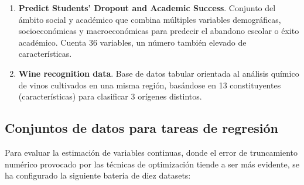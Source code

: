 \documentclass[a4paper,12pt,twoside,final]{book}
\begin{document}
\begin{enumerate}
  para predecir de forma binaria la aparición de diabetes, lo que permite analizar el impacto de la compresión en
  datos médicos sensibles.
  \item \textbf{Predict Students' Dropout and Academic Success}. Conjunto del ámbito social y académico que combina
  múltiples variables demográficas, socioeconómicas y macroeconómicas para predecir el abandono escolar o éxito
  académico. Cuenta 36 variables, un número también elevado de características.
  \item \textbf{Wine recognition data}. Base de datos tabular orientada al análisis químico de vinos cultivados en
  una misma región, basándose en 13 constituyentes (características) para clasificar 3 orígenes distintos.
\end{enumerate}

\subsection{Conjuntos de datos para tareas de regresión}
Para evaluar la estimación de variables continuas, donde el error de truncamiento numérico provocado por las técnicas
de optimización tiende a ser más evidente, se ha configurado la siguiente batería de diez datasets:
\end{document}
